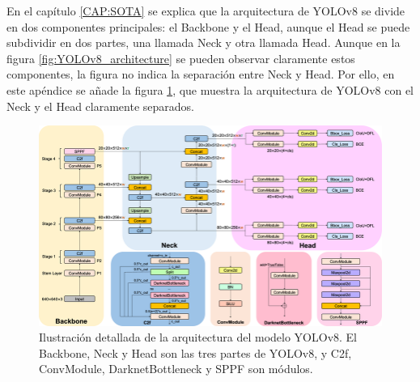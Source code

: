 En el capítulo \ref{CAP:SOTA} se explica que la arquitectura de YOLOv8 se divide en dos componentes principales: el Backbone y el Head, aunque el Head se puede subdividir en dos partes, una llamada Neck y otra llamada Head. Aunque en la figura \ref{fig:YOLOv8_architecture} se pueden observar claramente estos componentes, la figura no indica la separación entre Neck y Head. Por ello, en este apéndice se añade la figura \ref{fig:YOLOv8_architecture_neck_head}, que muestra la arquitectura de YOLOv8 con el Neck y el Head claramente separados.

\begin{figure}[H]
    \centering
    \includegraphics[width=1\textwidth]{../img/yolov8-arq2.png}
    \caption{Ilustración detallada de la arquitectura del modelo YOLOv8. El Backbone, Neck y Head son las tres partes de YOLOv8, y C2f, ConvModule, DarknetBottleneck y SPPF son módulos. \cite{Arquitectura_YOLOv8}}
    \label{fig:YOLOv8_architecture_neck_head}
\end{figure}
